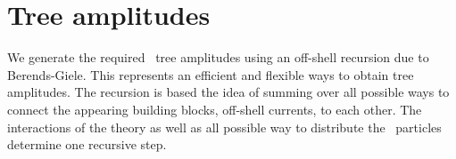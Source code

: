 \section{Tree amplitudes}
We generate the required \co~tree amplitudes using an off-shell recursion due to Berends-Giele. This represents an efficient and flexible ways to obtain tree amplitudes. The recursion is based the idea of summing over all possible ways to connect the appearing building blocks, off-shell currents, to each other. The interactions of the theory as well as all possible way to distribute the \co~particles determine one recursive step. 








